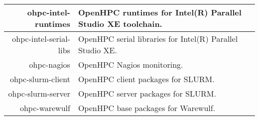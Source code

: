 \begin{tabularx}{\textwidth}{r|X}
\hline
ohpc-intel-runtimes & OpenHPC runtimes for Intel(R) Parallel Studio XE toolchain. \\ 
\hline
ohpc-intel-serial-libs & OpenHPC serial libraries for Intel(R) Parallel Studio XE. \\ 
\hline
ohpc-nagios & OpenHPC Nagios monitoring. \\ 
\hline
ohpc-slurm-client & OpenHPC client packages for SLURM. \\ 
\hline
ohpc-slurm-server & OpenHPC server packages for SLURM. \\ 
\hline
ohpc-warewulf & OpenHPC base packages for Warewulf. \\ 
\hline
\bottomrule
\end{tabularx}
